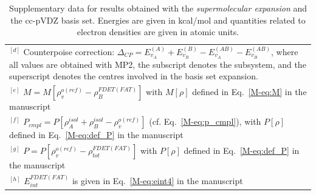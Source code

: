 \documentclass[amsmath,amssymb,preprint,aip,jcp]{revtex4-1}
\begin{document}
\begin{table}[H]
\begin{center}
{\begin{tabular}{|l|l|l|l|l|l|l|l|l|l|}
\multicolumn{10}{p{1.0\textwidth}}{$^{[d]}$ Counterpoise correction: $\Delta_{CP} = E_{v_A}^{(A)} + E_{v_B}^{(B)} - E_{v_A}^{(AB)} - E_{v_B}^{(AB)}$, where all values are obtained with MP2, the subscript denotes the subsystem, and the superscript denotes the centres involved in the basis set expansion.} \\
\multicolumn{10}{p{1.0\textwidth}}{$^{[e]}$ $M=M[\rho_v^{o(ref)} - \rho^{FDET(FAT)}_{B}]$ with $M[\rho]$ defined in Eq.~\ref{M-eq:M} in the manuscript}\\
\multicolumn{10}{p{1.0\textwidth}}{$^{[f]}$ $P_{cmpl}=P[\rho_A^{isol}+\rho_B^{isol} - \rho_v^{o(ref)}]$ (cf. Eq.~\ref{M-eq:p_cmpl}), with $P[\rho]$ defined in Eq.~\ref{M-eq:def_P} in the manuscript}\\
\multicolumn{10}{p{1.0\textwidth}}{$^{[g]}$ $P=P[\rho_v^{o(ref)} - \rho_{tot}^{FDET(FAT)}]$ with $P[\rho]$ defined in Eq.~\ref{M-eq:def_P} in the manuscript}\\
\multicolumn{10}{p{1.0\textwidth}}{$^{[h]}$ $E^{FDET(FAT)}_{int}$ is given in Eq.~\ref{M-eq:eint4} in the manuscript}\\
\end{tabular}
}
\end{center}
\caption{Supplementary data for results obtained with the \textit{supermolecular expansion} and the cc-pVDZ basis set. Energies are given in kcal/mol and quantities related to electron densities are given in atomic units.}
\end{table}
\end{document}
